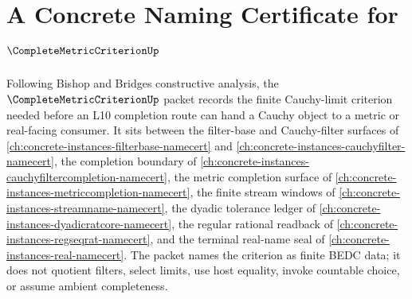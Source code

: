 \chapter{A Concrete Naming Certificate for $\CompleteMetricCriterionUp$}
\label{ch:concrete-instances-complete-metric-criterion-namecert}

Following Bishop and Bridges constructive analysis, the
$\CompleteMetricCriterionUp$ packet records the finite Cauchy-limit criterion
needed before an L10 completion route can hand a Cauchy object to a metric or
real-facing consumer. It sits between the filter-base and Cauchy-filter
surfaces of \autoref{ch:concrete-instances-filterbase-namecert} and
\autoref{ch:concrete-instances-cauchyfilter-namecert}, the completion boundary
of \autoref{ch:concrete-instances-cauchyfiltercompletion-namecert}, the
metric completion surface of
\autoref{ch:concrete-instances-metriccompletion-namecert}, the finite stream
windows of \autoref{ch:concrete-instances-streamname-namecert}, the dyadic
tolerance ledger of \autoref{ch:concrete-instances-dyadicratcore-namecert},
the regular rational readback of
\autoref{ch:concrete-instances-regseqrat-namecert}, and the terminal real-name
seal of \autoref{ch:concrete-instances-real-namecert}. The packet names the
criterion as finite BEDC data; it does not quotient filters, select limits,
use host equality, invoke countable choice, or assume ambient completeness.

